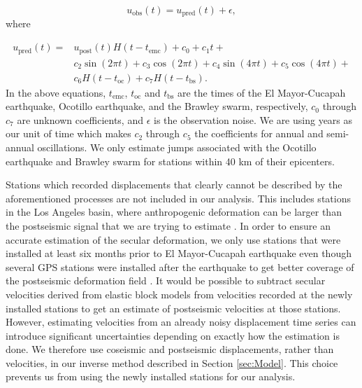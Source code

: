\documentclass[draft,linenumbers]{AGUJournal}
\begin{document}
\begin{equation}
  u_\mathrm{obs}(t) = u_\mathrm{pred}(t) + \epsilon,
\end{equation}
where

\begin{equation}\label{TimeSeriesModel}
  \begin{split}  
    u_\mathrm{pred}(t) = &u_\mathrm{post}(t)H(t-t_\mathrm{emc}) + c_0 + c_1t + \\
                         &c_2\sin(2\pi t) + c_3\cos(2\pi t) + c_4\sin(4\pi t) + c_5\cos(4\pi t) + \\
                         &c_6H(t-t_\mathrm{oc}) + c_7H(t-t_\mathrm{bs}).
  \end{split}
\end{equation}
In the above equations, $t_\mathrm{emc}$, $t_\mathrm{oc}$ and $t_\mathrm{bs}$ are the times of the El Mayor-Cucapah earthquake, Ocotillo earthquake, and the Brawley swarm, respectively, $c_0$ through $c_7$ are unknown coefficients, and $\epsilon$ is the observation noise.  We are using years as our unit of time which makes $c_2$ through $c_5$ the coefficients for annual and semi-annual oscillations.  We only estimate jumps associated with the Ocotillo earthquake and Brawley swarm for stations within 40 km of their epicenters. 

Stations which recorded displacements that clearly cannot be described by the aforementioned processes are not included in our analysis. This includes stations in the Los Angeles basin, where anthropogenic deformation can be larger than the postseismic signal that we are trying to estimate \citep{Bawden2001,Argus2005}. In order to ensure an accurate estimation of the secular deformation, we only use stations that were installed at least six months prior to El Mayor-Cucapah earthquake even though several GPS stations were installed after the earthquake to get better coverage of the postseismic deformation field \citep{Spinler2015}.  It would be possible to subtract secular velocities derived from elastic block models \citep[e.g.][]{Meade2005} from velocities recorded at the newly installed stations to get an estimate of postseismic velocities at those stations. However, estimating velocities from an already noisy displacement time series can introduce significant uncertainties depending on exactly how the estimation is done.  We therefore use coseismic and postseismic displacements, rather than velocities, in our inverse method described in Section \ref{sec:Model}. This choice prevents us from using the newly installed stations for our analysis.   
\end{document}

